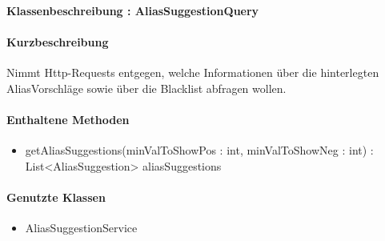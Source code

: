 \paragraph{Klassenbeschreibung : AliasSuggestionQuery}%
\paragraph*{Kurzbeschreibung}
Nimmt Http-Requests entgegen, welche Informationen über die hinterlegten AliasVorschläge sowie über die Blacklist abfragen wollen.
\paragraph*{Enthaltene Methoden}
\begin{itemize}
    \item getAliasSuggestions(minValToShowPos : int, minValToShowNeg : int) : List<AliasSuggestion> aliasSuggestions
\end{itemize}
\paragraph*{Genutzte Klassen}
\begin{itemize}
    \item AliasSuggestionService
\end{itemize}